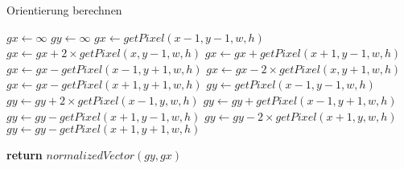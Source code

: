 \begin{algorithm}
	\caption{Orientierung berechnen}
	\label{src:analyseOrientation}
	\begin{algorithmic}[1]
			\State $gx \gets \infty$
			\State $gy \gets \infty$
			\State $gx \gets getPixel(x - 1, y - 1, w, h)$
			\State $gx \gets gx + 2 \times getPixel(x, y - 1, w, h)$
			\State $gx \gets gx + getPixel(x + 1, y - 1, w, h)$
			\State $gx \gets gx - getPixel(x - 1, y + 1, w, h)$
			\State $gx \gets gx - 2 \times getPixel(x, y + 1, w, h)$
			\State $gx \gets gx - getPixel(x + 1, y + 1, w, h)$
			\State $gy \gets getPixel(x - 1, y - 1, w, h)$
			\State $gy \gets gy + 2 \times getPixel(x - 1, y, w, h)$
			\State $gy \gets gy + getPixel(x - 1, y + 1, w, h)$
			\State $gy \gets gy - getPixel(x + 1, y - 1, w, h)$
			\State $gy \gets gy - 2 \times getPixel(x + 1, y, w, h)$
			\State $gy \gets gy - getPixel(x + 1, y + 1, w, h)$
			
			\State \textbf{return} $normalizedVector(gy, gx)$
		\EndProcedure
	\end{algorithmic}
\end{algorithm}
